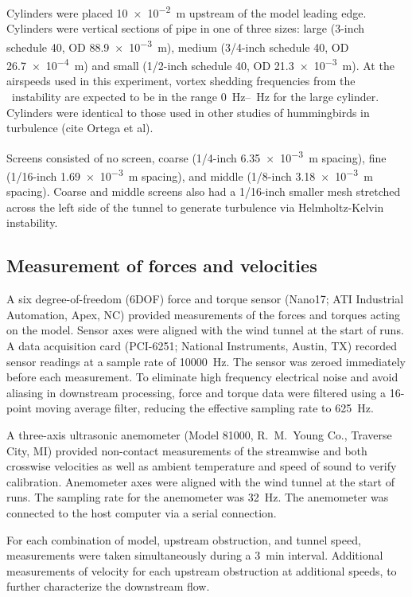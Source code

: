 Cylinders were placed \SI{10e-2}{\meter} upstream of the model leading edge.  Cylinders were vertical sections of pipe in one of three sizes: large (3-inch schedule 40, OD \SI{88.9e-3}{\meter}), medium (3/4-inch schedule 40, OD \SI{26.7e-4}{\meter}) and small (1/2-inch schedule 40, OD \SI{21.3e-3}{\meter}).  %
At the airspeeds used in this experiment, vortex shedding frequencies from the \vonKarman\ instability are expected to be in the range \SIrange{0}{}{\hertz} for the large cylinder. Cylinders were identical to those used in other studies of hummingbirds in turbulence (cite Ortega et al). 

Screens consisted of no screen, coarse (1/4-inch \SI{6.35e-3}{\meter} spacing), fine (1/16-inch \SI{1.69e-3}{\meter} spacing), and middle (1/8-inch \SI{3.18e-3}{\meter} spacing). Coarse and middle screens also had a 1/16-inch smaller mesh stretched across the left side of the tunnel to generate turbulence via Helmholtz-Kelvin instability.  

\subsection{Measurement of forces and velocities}
A six degree-of-freedom (6DOF) force and torque sensor (Nano17; ATI Industrial Automation, Apex, NC) provided measurements of the forces and torques acting on the model.  Sensor axes were aligned with the wind tunnel at the start of runs.  A data acquisition card (PCI-6251; National Instruments, Austin, TX) recorded sensor readings at a sample rate of \SI{10000}{\hertz}.  The sensor was zeroed immediately before each measurement.  To eliminate high frequency electrical noise and avoid aliasing in downstream processing, force and torque data were filtered using a 16-point moving average filter, reducing the effective sampling rate to \SI{625}{\hertz}.  

A three-axis ultrasonic anemometer (Model 81000, R.~M.~Young Co., Traverse City, MI) provided non-contact measurements of the streamwise and both crosswise velocities as well as ambient temperature and speed of sound to verify calibration.  Anemometer axes were aligned with the wind tunnel at the start of runs.  The sampling rate for the anemometer was \SI{32}{\hertz}. The anemometer was connected to the host computer via a serial connection.   

For each combination of model, upstream obstruction, and tunnel speed, measurements were taken simultaneously during a \SI{3}{\minute} interval.  Additional measurements of velocity for each upstream obstruction at additional speeds, to further characterize the downstream flow.  

